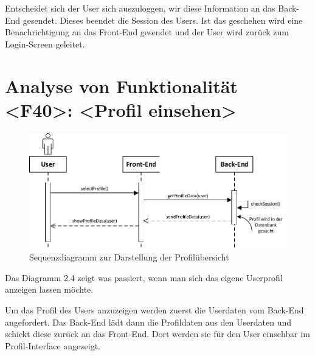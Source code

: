 Entscheidet sich der User sich auszuloggen, wir diese Information an das Back-End gesendet. Dieses beendet die Session des Users. Ist das geschehen wird eine Benachrichtigung an das Front-End gesendet und der User wird zurück zum Login-Screen geleitet.

\newpage
\section{Analyse von Funktionalität <F40>: <Profil einsehen>}
\begin{figure}[h]
\centering
\includegraphics[width=1.3\textwidth]{figures/sequenz_F40.pdf}
\caption{Sequenzdiagramm zur Darstellung der Profilübersicht}
\label{sequence}
\end{figure}
Das Diagramm 2.4 zeigt was passiert, wenn man sich das eigene Userprofil anzeigen lassen möchte.

Um das Profil des Users anzuzeigen werden zuerst die Userdaten vom Back-End angefordert. Das Back-End lädt dann die Profildaten aus den Userdaten und schickt diese zurück an das Front-End. Dort werden sie für den User einsehbar im Profil-Interface angezeigt.


\newpage
